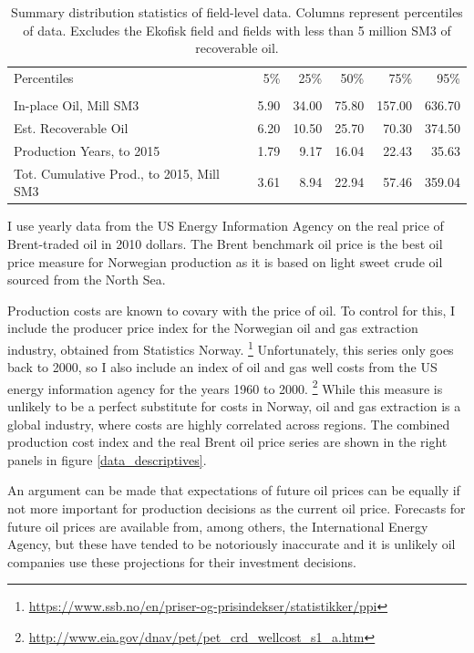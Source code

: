 \documentclass[12pt]{article}
\begin{document}
\begin{table}
\begin{tabular}{lrrrrr}
\toprule
Percentiles &    5\% &    25\% &    50\% &     75\% &     95\% \\
                      &       &        &        &         &         \\
\midrule
In-place Oil, Mill SM3         &  5.90 &  34.00 &  75.80 &  157.00 &  636.70 \\
Est. Recoverable Oil           &  6.20 &  10.50 &  25.70 &   70.30 &  374.50 \\
Production Years, to 2015      &  1.79 &   9.17 &  16.04 &   22.43 &   35.63 \\
Tot. Cumulative Prod., to 2015, Mill SM3 &  3.61 &   8.94 &  22.94 &   57.46 &  359.04 \\
\bottomrule
\end{tabular}
\caption{Summary distribution statistics of field-level data. Columns represent percentiles of data. Excludes the Ekofisk field and fields with less than 5 million SM3 of recoverable oil.}
\label{field_summary}
\end{table}

I use yearly data from the US Energy Information Agency on the real price of Brent-traded oil in 2010 dollars. The Brent benchmark oil price is the best oil price measure for Norwegian production as it is based on light sweet crude oil sourced from the North Sea.  

Production costs are known to covary with the price of oil.  To control for this, I include the producer price index for the Norwegian oil and gas extraction industry, obtained from Statistics Norway. \footnote{\url{https://www.ssb.no/en/priser-og-prisindekser/statistikker/ppi}} Unfortunately, this series only goes back to 2000, so I also include an index of oil and gas well costs from the US energy information agency for the years 1960 to 2000.  \footnote{\url{http://www.eia.gov/dnav/pet/pet_crd_wellcost_s1_a.htm}} While this measure is unlikely to be a perfect substitute for costs in Norway, oil and gas extraction is a global industry, where costs are highly correlated across regions. The combined production cost index and the real Brent oil price series are shown in the right panels in figure \ref{data_descriptives}.

An argument can be made that expectations of future oil prices can be equally if not more important for production decisions as the current oil price.  Forecasts for future oil prices are available from, among others, the International Energy Agency, but these have tended to be notoriously inaccurate and it is unlikely oil companies use these projections for their investment decisions.
\end{document}
